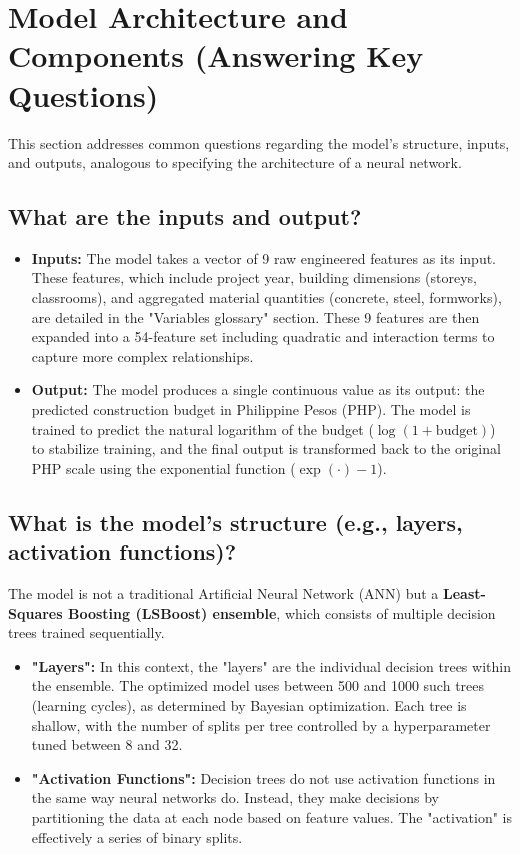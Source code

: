\documentclass[11pt]{article}
\begin{document}
\section*{Model Architecture and Components (Answering Key Questions)}
This section addresses common questions regarding the model's structure, inputs, and outputs, analogous to specifying the architecture of a neural network.

\subsection*{What are the inputs and output?}
\begin{itemize}
    \item \textbf{Inputs:} The model takes a vector of 9 raw engineered features as its input. These features, which include project year, building dimensions (storeys, classrooms), and aggregated material quantities (concrete, steel, formworks), are detailed in the "Variables glossary" section. These 9 features are then expanded into a 54-feature set including quadratic and interaction terms to capture more complex relationships.
    \item \textbf{Output:} The model produces a single continuous value as its output: the predicted construction budget in Philippine Pesos (PHP). The model is trained to predict the natural logarithm of the budget ($\log(1+\text{budget})$) to stabilize training, and the final output is transformed back to the original PHP scale using the exponential function ($\exp(\cdot)-1$).
\end{itemize}

\subsection*{What is the model's structure (e.g., layers, activation functions)?}
The model is not a traditional Artificial Neural Network (ANN) but a \textbf{Least-Squares Boosting (LSBoost) ensemble}, which consists of multiple decision trees trained sequentially.
\begin{itemize}
    \item \textbf{"Layers":} In this context, the "layers" are the individual decision trees within the ensemble. The optimized model uses between 500 and 1000 such trees (learning cycles), as determined by Bayesian optimization. Each tree is shallow, with the number of splits per tree controlled by a hyperparameter tuned between 8 and 32.
    \item \textbf{"Activation Functions":} Decision trees do not use activation functions in the same way neural networks do. Instead, they make decisions by partitioning the data at each node based on feature values. The "activation" is effectively a series of binary splits.
\end{itemize}
\end{document}

